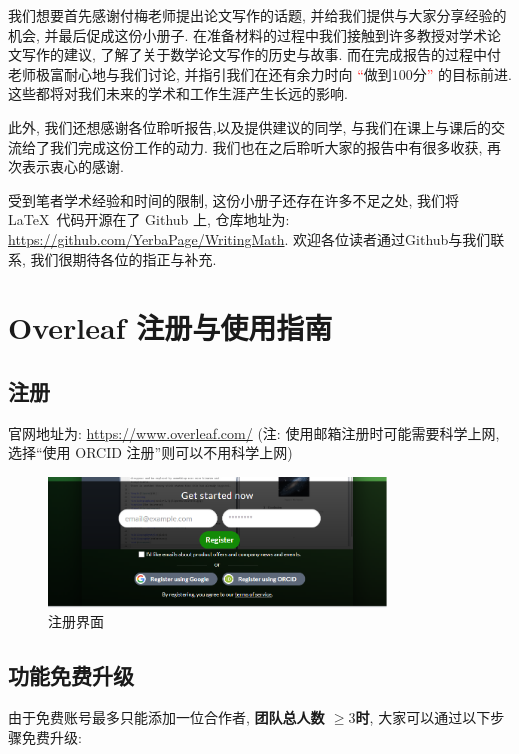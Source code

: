 \documentclass{formatBook}
\newcommand{\XG}[1]{\textcolor{red}{#1}}
\begin{document}
我们想要首先感谢付梅老师提出论文写作的话题, 并给我们提供与大家分享经验的机会, 并最后促成这份小册子. 在准备材料的过程中我们接触到许多教授对学术论文写作的建议, 了解了关于数学论文写作的历史与故事. 而在完成报告的过程中付老师极富耐心地与我们讨论, 并指引我们在还有余力时向 \XG{``}做到$100$分\XG{''} 的目标前进. 这些都将对我们未来的学术和工作生涯产生长远的影响.

此外, 我们还想感谢各位聆听报告,以及提供建议的同学, 与我们在课上与课后的交流给了我们完成这份工作的动力. 我们也在之后聆听大家的报告中有很多收获, 再次表示衷心的感谢.

受到笔者学术经验和时间的限制, 这份小册子还存在许多不足之处, 我们将 \LaTeX \ 代码开源在了 Github 上, 仓库地址为: \url{https://github.com/YerbaPage/WritingMath}. 欢迎各位读者通过Github与我们联系, 我们很期待各位的指正与补充.

\XG{\printbibliography}
\appendix
\chapter{Overleaf 注册与使用指南}\label{overleafGuide}
\color{red}
\section{注册}\label{header-n2}

官网地址为: \url{https://www.overleaf.com/} (注: 使用邮箱注册时可能需要科学上网, 选择``使用 ORCID 注册''则可以不用科学上网)

\begin{figure}[H]
    \centering
    \includegraphics[width=0.8\textwidth]{Guidepics/20210415183938.png}
    \caption{注册界面}
\end{figure}

\section{功能免费升级}\label{header-n5}

由于免费账号最多只能添加一位合作者, \textbf{团队总人数 \( \geq3\)时},
大家可以通过以下步骤免费升级:
\end{document}
